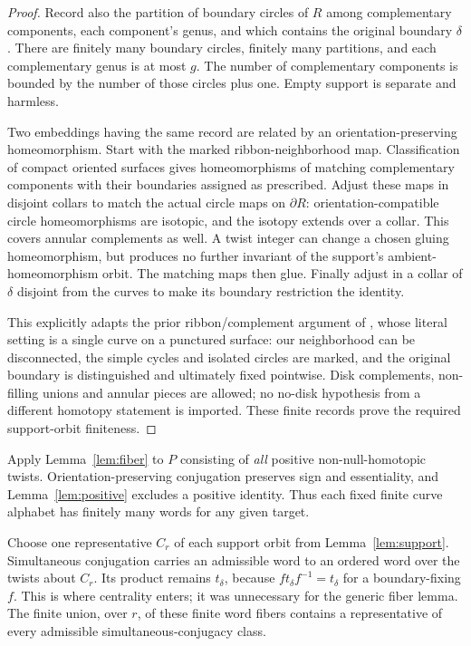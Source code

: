 \documentclass[11pt]{article}
\begin{document}
\begin{proof}
Record also the partition of boundary circles of $R$ among complementary components, each component's genus, and which contains the original boundary $\delta$. There are finitely many boundary circles, finitely many partitions, and each complementary genus is at most $g$. The number of complementary components is bounded by the number of those circles plus one. Empty support is separate and harmless.

Two embeddings having the same record are related by an orientation-preserving homeomorphism. Start with the marked ribbon-neighborhood map. Classification of compact oriented surfaces gives homeomorphisms of matching complementary components with their boundaries assigned as prescribed. Adjust these maps in disjoint collars to match the actual circle maps on $\partial R$: orientation-compatible circle homeomorphisms are isotopic, and the isotopy extends over a collar. This covers annular complements as well. A twist integer can change a chosen gluing homeomorphism, but produces no further invariant of the support's ambient-homeomorphism orbit. The matching maps then glue. Finally adjust in a collar of $\delta$ disjoint from the curves to make its boundary restriction the identity.

This explicitly adapts the prior ribbon/complement argument of \cite[Lemma 10]{CFP}, whose literal setting is a single curve on a punctured surface: our neighborhood can be disconnected, the simple cycles and isolated circles are marked, and the original boundary is distinguished and ultimately fixed pointwise. Disk complements, non-filling unions and annular pieces are allowed; no no-disk hypothesis from a different homotopy statement is imported. These finite records prove the required support-orbit finiteness.
\end{proof}

Apply Lemma~\ref{lem:fiber} to $P$ consisting of \emph{all} positive non-null-homotopic twists. Orientation-preserving conjugation preserves sign and essentiality, and Lemma~\ref{lem:positive} excludes a positive identity. Thus each fixed finite curve alphabet has finitely many words for any given target.

Choose one representative $C_r$ of each support orbit from Lemma~\ref{lem:support}. Simultaneous conjugation carries an admissible word to an ordered word over the twists about $C_r$. Its product remains $t_\delta$, because $f t_\delta f^{-1}=t_\delta$ for a boundary-fixing $f$. This is where centrality enters; it was unnecessary for the generic fiber lemma. The finite union, over $r$, of these finite word fibers contains a representative of every admissible simultaneous-conjugacy class.
\end{document}
